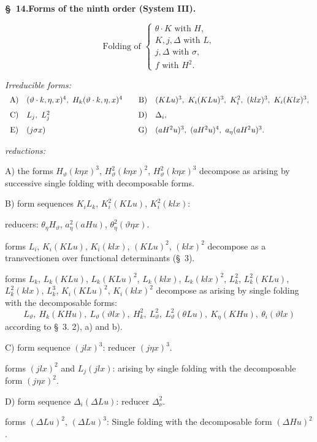 \documentclass[11pt]{article}
\newcommand{\A}{\Delta}
\begin{document}
\begin{center}
\textbf{\S\ 14.\quad Forms of the ninth order (System III).}
\end{center}
\[
\text{Folding of }\left\{\begin{array}{l}
\theta\cdot K\text{ with }H,\\
K,j,\A\text{ with }L,\\
j,\A\text{ with }\sigma,\\
f\text{ with }H^2.
\end{array}\right.
\]

\noindent\emph{Irreducible forms:}
\[
\begin{array}{c@{\quad}l@{\qquad}c@{\quad}l}
\text{A)}&(\vartheta\cdot k,\eta,x)^4,
\ H_k(\vartheta\cdot k,\eta,x)^4&
\text{B)}&(KLu)^3,
\ K_i(KLu)^3,
\ K_i^2,
\ (klx)^3,
\ K_i(Klx)^3,\\[0.7em]
\text{C)}&L_j,
\ L_j^2&
\text{D)}&\A_i,\\[0.7em]
\text{E)}&(j\sigma x)&
\text{G)}&(aH^2u)^3,
\ (aH^2u)^4,
\ a_\eta(aH^2u)^3.
\end{array}
\]

\noindent\emph{reductions:}

A) the forms $H_\vartheta(k\eta x)^3$, $H_\vartheta^2(k\eta x)^2$, $H_\vartheta^2(k\eta x)^3$ decompose as arising by successive single folding with decomposable forms.

B) form sequences $K_iL_k$, $K_i^2(KLu)$, $K_i^2(klx)$:

reducers: $\theta_\eta H_\vartheta$, $a_\eta^2(aHu)$, $\theta_\eta^2(\vartheta\eta x)$.

forms $L_i$, $K_i(KLu)$, $K_i(klx)$, $(KLu)^2$, $(klx)^2$ decompose as a transvectionen over functional determinants (\S\ 3).

forms $L_k$, $L_k(KLu)$, $L_k(KLu)^2$, $L_k(klx)$, $L_k(klx)^2$, $L_k^2$, $L_k^2(KLu)$, $L_k^2(klx)$, $L_k^3$, $K_i(KLu)^2$, $K_i(klx)^2$ decompose as arising by single folding with the decomposable forms:
\[
L_\vartheta,
\ H_k(KHu),
\ L_\vartheta(\vartheta lx),
\ H_k^2,
\ L_\vartheta^2,
\ L_\vartheta^2(\theta Lu),
\ K_\eta(KHu),
\ \theta_i(\vartheta lx)
\]
according to \S\ 3. 2), a) and b).

C) form sequence $(jlx)^3$: reducer $(j\eta x)^3$.

forms $(jlx)^2$ and $L_j(jlx)$: arising by single folding with the decomposable form $(j\eta x)^2$.

D) form sequence $\A_i(\A Lu)$: reducer $\A_\nu^2$.

forms $(\A Lu)^2$, $(\A Lu)^3$: Single folding with the decomposable form $(\A Hu)^2$.
\end{document}
